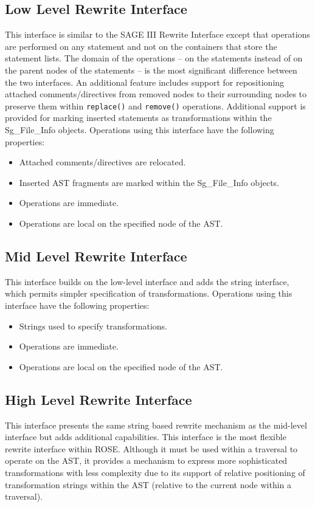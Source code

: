 \subsection{Low Level Rewrite Interface}
    This interface is similar to the SAGE III Rewrite Interface except that operations
are performed on any statement and not on the containers that store the statement lists.
The domain of the operations -- on the statements instead of on the parent nodes of the 
statements -- is the most significant difference between the two interfaces.  An additional
feature includes support for repositioning attached comments/directives from removed
nodes to their surrounding nodes to preserve them within {\tt replace()} and 
{\tt remove()} operations.  Additional support is provided for marking inserted statements
as transformations within the Sg\_File\_Info objects.
Operations using this interface have the following properties:
\begin{itemize}
   \item Attached comments/directives are relocated.
   \item Inserted AST fragments are marked within the Sg\_File\_Info objects.
   \item Operations are immediate.
   \item Operations are local on the specified node of the AST.
\end{itemize}

\subsection{Mid Level Rewrite Interface}
    This interface builds on the low-level interface and adds the string interface,
which permits simpler specification of transformations.
Operations using this interface have the following properties:
\begin{itemize}
   \item Strings used to specify transformations.
   \item Operations are immediate.
   \item Operations are local on the specified node of the AST.
\end{itemize}

\subsection{High Level Rewrite Interface}
    This interface presents the same string based rewrite mechanism as the mid-level
interface but adds additional capabilities.
This interface is the most flexible rewrite interface within ROSE.  Although it 
must be used within a traversal to operate on the AST, it provides a mechanism to express
more sophisticated transformations with less complexity due to its support of relative 
positioning of transformation strings within the AST (relative to the current node within
a traversal). 

